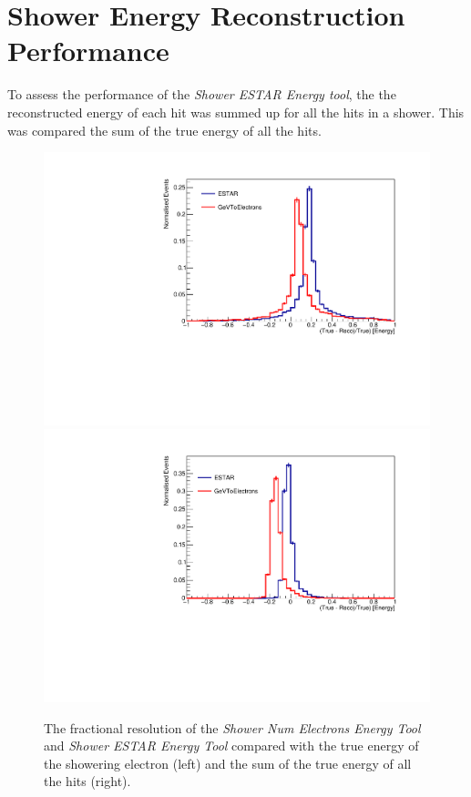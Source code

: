 \section{Shower Energy Reconstruction Performance}



To assess the performance of the \textit{Shower ESTAR Energy tool}, the the reconstructed energy of each hit was summed up for all the hits in a shower. This was compared the sum of the true energy of all the hits.


\begin{figure}
    \centering
    \includegraphics[width = \smallfigwidth]{figures-chap4/ESTAR_kGeVElectrons_true_showering.pdf}
    \includegraphics[width = \smallfigwidth]{figures-chap4/ESTAR_kGeVElectrons_true_hit.pdf}
    \caption{The fractional resolution of the \textit{Shower Num Electrons Energy Tool} and \textit{Shower ESTAR Energy Tool} compared with the true energy of the showering electron (left) and the sum of the true energy of all the hits (right). }
    \label{fig:my_label}
\end{figure}

